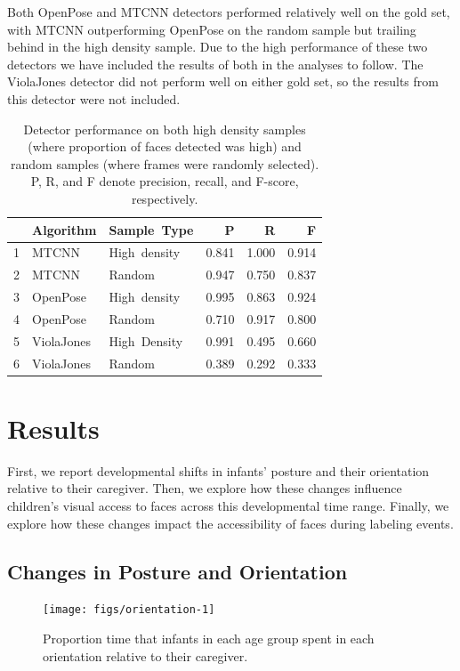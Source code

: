 \documentclass[10pt, letterpaper]{article}
\newenvironment{CodeChunk}{}{}
\begin{document}
Both OpenPose and MTCNN detectors performed relatively well on the gold
set, with MTCNN outperforming OpenPose on the random sample but trailing
behind in the high density sample. Due to the high performance of these
two detectors we have included the results of both in the analyses to
follow. The ViolaJones detector did not perform well on either gold set,
so the results from this detector were not included.

\begin{table}[ht]
\centering
\begin{tabular}{rllrrr}
  \hline
 & Algorithm & Sample\ Type & P & R & F \\ 
  \hline
1 & MTCNN & High\ density & 0.841 & 1.000 & 0.914 \\ 
  2 & MTCNN & Random & 0.947 & 0.750 & 0.837 \\ 
  3 & OpenPose & High\ density & 0.995 & 0.863 & 0.924 \\ 
  4 & OpenPose & Random & 0.710 & 0.917 & 0.800 \\ 
  5 & ViolaJones & High\ Density & 0.991 & 0.495 & 0.660 \\ 
  6 & ViolaJones & Random & 0.389 & 0.292 & 0.333 \\ 
   \hline
\end{tabular}
\caption{Detector performance on both high density samples (where proportion of faces detected was high) and random samples (where frames were randomly selected). P, R, and F denote precision, recall, and F-score, respectively.} 
\end{table}

\section{Results}\label{results}

First, we report developmental shifts in infants' posture and their
orientation relative to their caregiver. Then, we explore how these
changes influence children's visual access to faces across this
developmental time range. Finally, we explore how these changes impact
the accessibility of faces during labeling events.

\subsection{Changes in Posture and
Orientation}\label{changes-in-posture-and-orientation}

\begin{CodeChunk}
\begin{figure}[h]

{\centering \texttt{[image: figs/orientation-1]} 

}

\caption[Proportion time that infants in each age group spent in each orientation relative to their caregiver]{Proportion time that infants in each age group spent in each orientation relative to their caregiver.}\label{fig:orientation}
\end{figure}
\end{CodeChunk}
\end{document}
